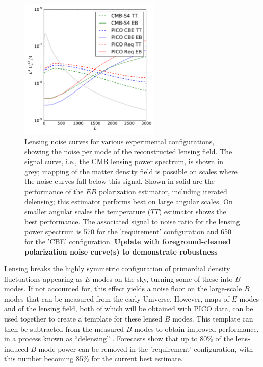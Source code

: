 \documentclass[PICOReport.tex]{subfiles}
\begin{document}
{\begin{figure}
\begin{center}
\includegraphics[width=0.6\textwidth]{images/lensingNoisePICO.pdf}
\end{center}
\caption{\label{fig:lensingNoisePICO} Lensing noise curves for various experimental configurations, showing the noise per mode of the reconstructed lensing field.  The signal curve, i.e., the CMB lensing power spectrum, is shown in grey; mapping of the matter density field is possible on scales where the noise curves fall below this signal.  Shown in solid are the performance of the $EB$ polarization estimator, including iterated delensing; this estimator performs best on large angular scales.  On smaller angular scales the temperature ($TT$) estimator shows the best performance. The associated signal to noise ratio for the lensing power spectrum is 570 for the 'requirement' configuration and 650 for the 'CBE' configuration. \textbf{Update with foreground-cleaned polarization noise curve(s) to demonstrate robustness}}
\end{figure}

Lensing breaks the highly symmetric configuration of primordial density fluctuations appearing as $E$ modes on the sky, turning some of these into $B$ modes.  If not accounted for, this effect yields a noise floor on the large-scale $B$ modes that can be measured from the early Universe.  However, maps of $E$ modes and of the lensing field, both of which will be obtained with PICO data, can be used together to create a template for these lensed $B$ modes.  This template can then be subtracted from the measured $B$ modes to obtain improved performance, in a process known as ``delensing'' \citep{2004PhRvD..69d3005S,2012JCAP...06..014S}.  Forecasts show that up to 80\% of the lens-induced $B$ mode power can be removed in the 'requirement' configuration, with this number becoming 85\% for the current best estimate.  

}
\end{document}
